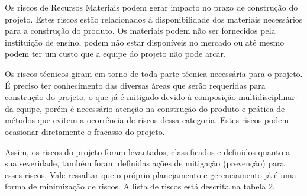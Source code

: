 Os riscos de Recursos Materiais podem gerar impacto no prazo de construção do projeto. Estes riscos estão relacionados à disponibilidade dos materiais necessários para a construção do produto. Os materiais podem não ser fornecidos pela instituição de ensino, podem não estar disponíveis no mercado ou até mesmo podem ter um custo que a equipe do projeto não pode arcar. 

Os riscos técnicos giram em torno de toda parte técnica necessária para o projeto. É preciso ter conhecimento das diversas áreas que serão requeridas para construção do projeto, o que já é mitigado devido à composição multidisciplinar da equipe, porém é necessário atenção na construção do produto e prática de métodos que evitem a ocorrência de riscos dessa categoria. Estes riscos podem ocasionar diretamente o fracasso do projeto.
 
Assim, os riscos do projeto foram levantados, classificados e definidos quanto a sua severidade, também foram definidas ações de mitigação (prevenção) para esses riscos. Vale ressaltar que o próprio planejamento e gerenciamento já é uma forma de minimização de riscos. A lista de riscos está descrita na tabela 2.


